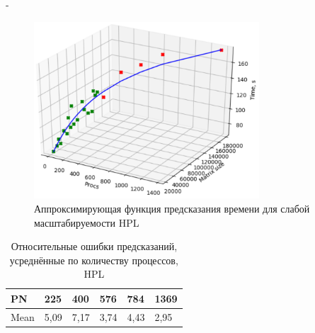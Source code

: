 \documentclass[unicode, t, 11pt]{beamer}%
\newlength{\mylen}
\begin{document}
\begin{frame}
\begin{columns}[T]
\begin{column}{\mylen}
	 			\end{column}
	 			\begin{column}{\dimexpr\textwidth-\mylen}
		 			\begin{figure}
						\captionsetup{font=tiny, labelfont=tiny}
						\includegraphics[width=0.788\textwidth]{./images/aa}%
						\caption{Аппроксимирующая функция предсказания времени для слабой масштабируемости HPL}
						\label{figure_HPL_C_3}
					\end{figure}
		 			\begin{table}
			 			\captionsetup{font=tiny, labelfont=tiny}
			 			\tiny
							\begin{tabularx}{\textwidth}{|X|X|X|X|X|X|}%
								\hline
								  PN &  225 &  400 &  576 &  784 & 1369 \\ \hline
								Mean & 5,09 & 7,17 & 3,74 & 4,43 & 2,95 \\ \hline
							\end{tabularx}
						\caption{Относительные ошибки предсказаний, усреднённые по количеству процессов, HPL}
					\end{table}
				\end{column}
	 		\end{columns}
	 	\end{frame}
\end{document}
